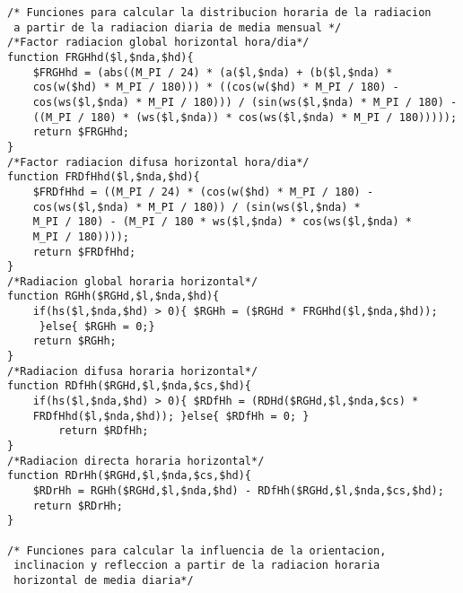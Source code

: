 \begin{verbatim}
/* Funciones para calcular la distribucion horaria de la radiacion
 a partir de la radiacion diaria de media mensual */
/*Factor radiacion global horizontal hora/dia*/
function FRGHhd($l,$nda,$hd){
	$FRGHhd = (abs((M_PI / 24) * (a($l,$nda) + (b($l,$nda) *
	cos(w($hd) * M_PI / 180))) * ((cos(w($hd) * M_PI / 180) - 
	cos(ws($l,$nda) * M_PI / 180))) / (sin(ws($l,$nda) * M_PI / 180) -
	((M_PI / 180) * (ws($l,$nda)) * cos(ws($l,$nda) * M_PI / 180)))));
	return $FRGHhd;
}
/*Factor radiacion difusa horizontal hora/dia*/
function FRDfHhd($l,$nda,$hd){
	$FRDfHhd = ((M_PI / 24) * (cos(w($hd) * M_PI / 180) - 
	cos(ws($l,$nda) * M_PI / 180)) / (sin(ws($l,$nda) * 
	M_PI / 180) - (M_PI / 180 * ws($l,$nda) * cos(ws($l,$nda) * 
	M_PI / 180))));
	return $FRDfHhd;
}
/*Radiacion global horaria horizontal*/
function RGHh($RGHd,$l,$nda,$hd){
	if(hs($l,$nda,$hd) > 0){ $RGHh = ($RGHd * FRGHhd($l,$nda,$hd));
	 }else{ $RGHh = 0;}
	return $RGHh;
}
/*Radiacion difusa horaria horizontal*/
function RDfHh($RGHd,$l,$nda,$cs,$hd){
	if(hs($l,$nda,$hd) > 0){ $RDfHh = (RDHd($RGHd,$l,$nda,$cs) * 
	FRDfHhd($l,$nda,$hd)); }else{ $RDfHh = 0; }
        return $RDfHh;
}
/*Radiacion directa horaria horizontal*/
function RDrHh($RGHd,$l,$nda,$cs,$hd){
	$RDrHh = RGHh($RGHd,$l,$nda,$hd) - RDfHh($RGHd,$l,$nda,$cs,$hd);
	return $RDrHh;
}

/* Funciones para calcular la influencia de la orientacion,
 inclinacion y refleccion a partir de la radiacion horaria
 horizontal de media diaria*/


\end{verbatim}
